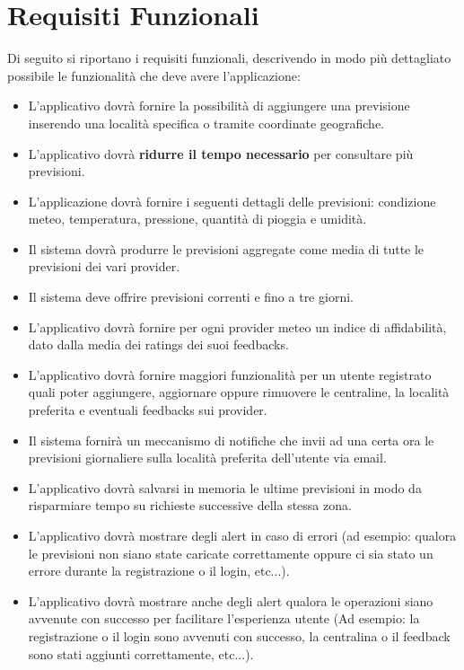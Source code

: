 	\section{Requisiti Funzionali} %
	Di seguito si riportano i requisiti funzionali, descrivendo in modo più dettagliato possibile le funzionalità che deve avere l'applicazione:
	 \begin{itemize}
	 \item L'applicativo dovrà fornire la possibilità di aggiungere una previsione inserendo una località specifica o tramite coordinate geografiche.
	\item L'applicativo dovrà \textbf{ridurre il tempo necessario} per consultare più previsioni.
	\item L'applicazione dovrà fornire i seguenti dettagli delle previsioni: condizione meteo, temperatura, pressione, quantità di pioggia e umidità.
	\item Il sistema dovrà produrre le previsioni aggregate come media di tutte le previsioni dei vari provider.
	\item Il sistema deve offrire previsioni correnti e fino a tre giorni.
	\item L'applicativo dovrà fornire per ogni provider meteo un indice di affidabilità, dato dalla media dei ratings dei suoi feedbacks.
	\item L'applicativo dovrà fornire maggiori funzionalità per un utente registrato quali poter aggiungere, aggiornare oppure rimuovere le centraline, la località preferita e eventuali feedbacks sui provider.
	\item Il sistema fornirà un meccanismo di notifiche che invii ad una certa ora le previsioni giornaliere sulla località preferita dell'utente via email.
	\item L'applicativo dovrà salvarsi in memoria le ultime previsioni in modo da risparmiare tempo su richieste successive della stessa zona. 
	\item L'applicativo dovrà mostrare degli alert in caso di errori (ad esempio: qualora le previsioni non siano state caricate correttamente oppure ci sia stato un errore durante la registrazione o il login, etc...).
	\item L'applicativo dovrà mostrare anche degli alert qualora le operazioni siano avvenute con successo per facilitare l'esperienza utente (Ad esempio: la registrazione o il login sono avvenuti con successo, la centralina o il feedback sono stati aggiunti correttamente, etc...).

	\end{itemize}
